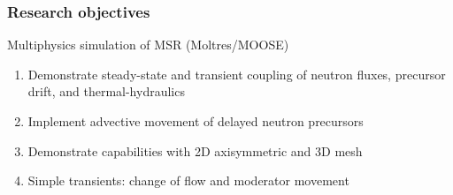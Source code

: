 \begin{frame}
  \frametitle{Research objectives}
                  \vspace*{-0.1in}

              \begin{block}{Multiphysics simulation of \gls{MSR} (Moltres/MOOSE)\cite{lindsay_introduction_2018}}
               \begin{enumerate}
                \item Demonstrate steady-state and transient coupling of neutron fluxes, precursor drift, and thermal-hydraulics
                \item Implement advective movement of delayed neutron precursors
                \item Demonstrate capabilities with 2D axisymmetric and 3D mesh
                \item Simple transients: change of flow and moderator movement
               \end{enumerate}
               \end{block}


              
\end{frame}
